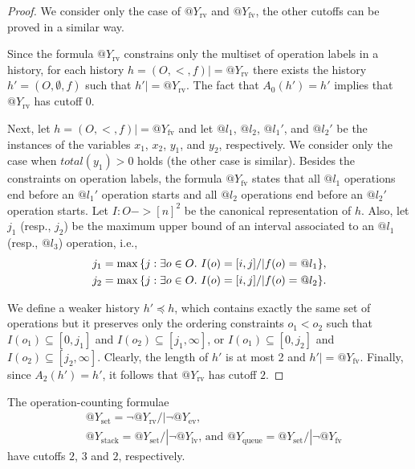 \begin{proof}

 We consider only the case of $@Y_\mathrm{rv}$ and $@Y_\mathrm{fv}$, the other cutoffs can be proved
 in a similar way.
 
 Since the formula $@Y_\mathrm{rv}$ constrains only the multiset of operation labels in a history,
 for each history $h=(O,<,f) |= @Y_\mathrm{rv}$ there exists the history $h'=(O,\emptyset,f)$
 such that $h' |= @Y_\mathrm{rv}$. The fact that $A_0(h')=h'$ implies that $@Y_\mathrm{rv}$ has
 cutoff $0$.
 
 Next, let $h=(O,<,f) |= @Y_\mathrm{fv}$ and let $@l_1$, $@l_2$, $@l_1'$, and $@l_2'$ be the
 instances of the variables $x_1$, $x_2$, $y_1$, and $y_2$, respectively. We consider only the case
 when $total(y_1)>0$ holds (the other case is similar). Besides the constraints on operation labels, 
 the formula $@Y_\mathrm{fv}$ states that all $@l_1$ operations end before an $@l_1'$ operation
 starts and all $@l_2$ operations end before an $@l_2'$ operation starts. 
 Let $I:O->[n]^2$ be the canonical representation of $h$. Also, let $j_1$ (resp., $j_2$) be the maximum upper bound
 of an interval associated to an $@l_1$ (resp., $@l_3$) operation, i.e.,
 \begin{align*}
 j_1 = \max{\{ j:\exists o\in O.\ I(o) = [i,j] /| f(o)=@l_1 \}},\\
  j_2 = \max{\{ j:\exists o\in O.\ I(o) = [i,j] /| f(o)=@l_2 \}}.
 \end{align*}
 
 We define a weaker history $h'\preceq h$, which contains exactly the same set of operations but it 
 preserves only the ordering constraints $o_1<o_2$ such that 
 $I(o_1)\subseteq [0,j_1]$ and $I(o_2)\subseteq [j_1,\infty]$, or  $I(o_1)\subseteq [0,j_2]$ and $I(o_2)\subseteq [j_2,\infty]$.
 Clearly, the 
 length of $h'$ is at most 2 
 and $h'|= @Y_\mathrm{fv}$. Finally, since 
 $A_2(h')=h'$, it follows that $@Y_\mathrm{rv}$ has cutoff $2$.
\end{proof}

\begin{corollary}

  The operation-counting formulae
  \begin{align*}
    & @Y_\mathrm{set}   = \lnot @Y_\mathrm{rv} /| \lnot @Y_\mathrm{ev}
    \text{, } \\
    & @Y_\mathrm{stack} = @Y_\mathrm{set} /| \lnot @Y_\mathrm{lv}
    \text{, and }
    @Y_\mathrm{queue} = @Y_\mathrm{set} /| \lnot @Y_\mathrm{fv}
  \end{align*}
  have cutoffs $2$, $3$ and $2$, respectively.

\end{corollary}

